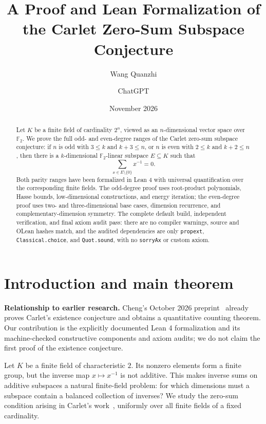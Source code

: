 \documentclass[11pt]{amsart}
\title[The Carlet zero-sum subspace conjecture]{A Proof and Lean Formalization of the Carlet Zero-Sum Subspace Conjecture}
\author{Wang Quanzhi}
\author{ChatGPT}
\date{November 2026}
\numberwithin{equation}{section}
\theoremstyle{definition}
\theoremstyle{remark}
\newcommand{\Ftwo}{\mathbb F_2}
\begin{document}
\begin{abstract}
Let $K$ be a finite field of cardinality $2^n$, viewed as an $n$-dimensional vector space over $\Ftwo$. We prove the full odd- and even-degree ranges of the Carlet zero-sum subspace conjecture: if $n$ is odd with $3\le k$ and $k+3\le n$, or $n$ is even with $2\le k$ and $k+2\le n$, then there is a $k$-dimensional $\Ftwo$-linear subspace $E\subseteq K$ such that
\[
  \sum_{x\in E\setminus\{0\}}x^{-1}=0.
\]
Both parity ranges have been formalized in Lean 4 with universal quantification over the corresponding finite fields. The odd-degree proof uses root-product polynomials, Hasse bounds, low-dimensional constructions, and energy iteration; the even-degree proof uses two- and three-dimensional base cases, dimension recurrence, and complementary-dimension symmetry. The complete default build, independent verification, and final axiom audit pass: there are no compiler warnings, source and OLean hashes match, and the audited dependencies are only \texttt{propext}, \texttt{Classical.choice}, and \texttt{Quot.sound}, with no \texttt{sorryAx} or custom axiom.
\end{abstract}


\maketitle

\section{Introduction and main theorem}

\noindent\textbf{Relationship to earlier research.} Cheng's October 2026 preprint~\cite{Cheng2026} already proves Carlet's existence conjecture and obtains a quantitative counting theorem. Our contribution is the explicitly documented Lean 4 formalization and its machine-checked constructive components and axiom audits; we do not claim the first proof of the existence conjecture.


Let $K$ be a finite field of characteristic $2$. Its nonzero elements form a finite group, but the inverse map $x\mapsto x^{-1}$ is not additive. This makes inverse sums on additive subspaces a natural finite-field problem: for which dimensions must a subspace contain a balanced collection of inverses? We study the zero-sum condition arising in Carlet's work~\cite{Carlet2025}, uniformly over all finite fields of a fixed cardinality.
\end{document}
